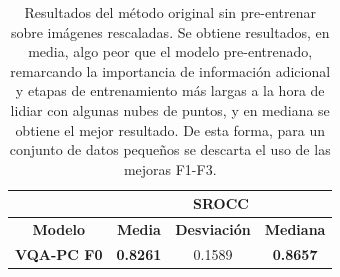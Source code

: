 \begin{table}[htp] 
  \scriptsize
  \centering
  \begin{tabular}{|c|c|c|c|}
\hline
\rowcolor[HTML]{FFC702}
                       & \multicolumn{3}{c|}{\textbf{SROCC}}                                                                                                          \\ \hline
\rowcolor[HTML]{FFC702}
\textbf{Modelo}        & \multicolumn{1}{c|}{\textbf{Media}} & \multicolumn{1}{c|}{\textbf{Desviación}} & \multicolumn{1}{c|}{\textbf{Mediana}} \\ \hline
\textbf{VQA-PC F0} & \multicolumn{1}{c|}{\textbf{0.8261}}   & \multicolumn{1}{c|}{0.1589}      & \multicolumn{1}{c|}{\textbf{0.8657}}      \\ \hline
  \end{tabular}
  \caption[Resultados del método original sin pre-entrenar sobre imágenes rescaladas.]{
    Resultados del método original sin pre-entrenar sobre imágenes rescaladas. 
    Se obtiene resultados, en media, algo peor que el modelo 
  pre-entrenado, remarcando la importancia de información adicional y etapas 
  de entrenamiento más largas a la hora de lidiar con algunas nubes de puntos, y 
  en mediana se obtiene el mejor resultado. De esta forma, para un conjunto 
  de datos pequeños se descarta el uso de las mejoras F1-F3.
}
\label{tab:VQAF0}
\end{table}
